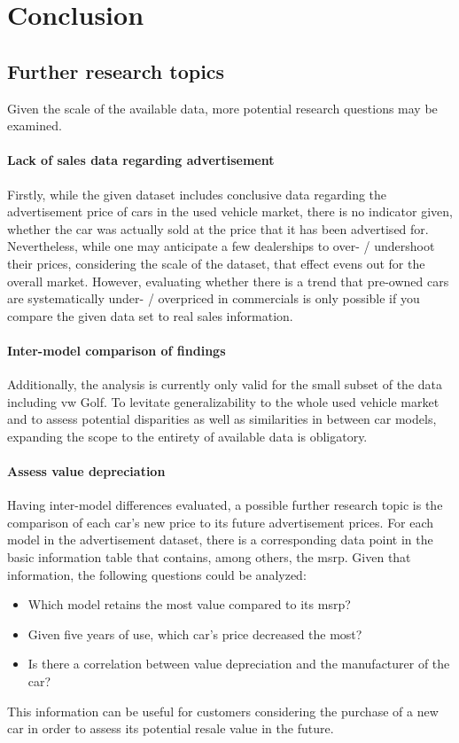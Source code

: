 \chapter{Conclusion}
\section{Further research topics}
Given the scale of the available data, more potential research questions may be examined. 

\subsubsection{Lack of sales data regarding advertisement}
Firstly, while the given dataset includes conclusive data regarding the advertisement price of cars in the used vehicle market,
there is no indicator given, whether the car was actually sold at the price that it has been advertised for. 
\newline
Nevertheless, while one may anticipate a few dealerships to over- / undershoot their prices,
considering the scale of the dataset, that effect evens out for the overall market.
However, evaluating whether there is a trend that pre-owned cars are systematically under- / overpriced in commercials
is only possible if you compare the given data set to real sales information.
\subsubsection{Inter-model comparison of findings}
Additionally, the analysis is currently only valid for the small subset of the data including \ac{vw} Golf. 
To levitate generalizability to the whole used vehicle market and to assess potential disparities as well as similarities in between 
car models, expanding the scope to the entirety of available data is obligatory.  
\subsubsection{Assess value depreciation}
Having inter-model differences evaluated, a possible further research topic is the comparison of each car's new price
to its future advertisement prices. For each model in the advertisement dataset, there is a corresponding data point
in the basic information table that contains, among others, the \ac{msrp}. 
\newline
Given that information, the following questions could be analyzed: 
\begin{itemize}
\item Which model retains the most value compared to its \ac{msrp}?
\item Given five years of use, which car's price decreased the most?
\item Is there a correlation between value depreciation and the manufacturer of the car?
\end{itemize}
This information can be useful for customers considering the purchase of a new car in order to assess its potential resale value in the future.

